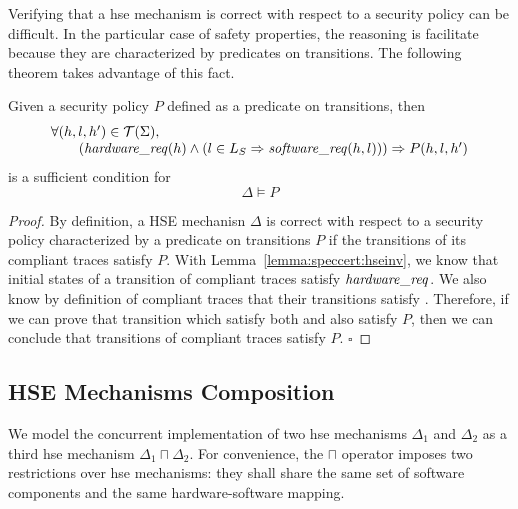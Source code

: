 Verifying that a \ac{hse} mechanism is correct with respect to a security policy
can be difficult.
%
In the particular case of safety properties, the reasoning is facilitate because
they are characterized by predicates on transitions.
%
The following theorem takes advantage of this fact.

\begin{theorem}
  \label{theorem:speccert:correcthse}
  Given a security policy $P$ defined as a predicate on transitions, then
  \[
    \begin{array}{l}
      \forall (h, l, h') \in \mathcal{T}(\Sigma), \\
      \qquad (\mathit{hardware\_req}(h) \wedge
      (l \in L_{S} \Rightarrow \mathit{software\_req}(h, l)))
      \Rightarrow P(h, l, h')
    \end{array}
  \]
  is a sufficient condition for
  \[
    \Delta \models P
  \]

  \begin{proof}
    By definition, a HSE mechanisn \( \Delta \) is correct with respect to a
    security policy characterized by a predicate on transitions \( P \) if the
    transitions of its compliant traces satisfy \( P \).
    With Lemma~\ref{lemma:speccert:hseinv}, we know that initial states of a
    transition of compliant traces satisfy $\mathit{hardware\_req}$.
    We also know by definition of compliant traces that their transitions
    satisfy .
    Therefore, if we can prove that transition which satisfy both
     and  also satisfy \( P \), then we
    can conclude that transitions of compliant traces satisfy \( P \).
    \hfill \( \square \)
  \end{proof}
\end{theorem}

\subsection{HSE Mechanisms Composition}
\label{subsec:speccert:compo}

We model the concurrent implementation of two \ac{hse} mechanisms \( \Delta_1 \)
and \( \Delta_2 \) as a third \ac{hse} mechanism \( \Delta_1 \sqcap \Delta_2 \).
%
For convenience, the \( \sqcap \) operator imposes two restrictions over
\ac{hse} mechanisms: they shall share the same set of software components and
the same hardware-software mapping.

